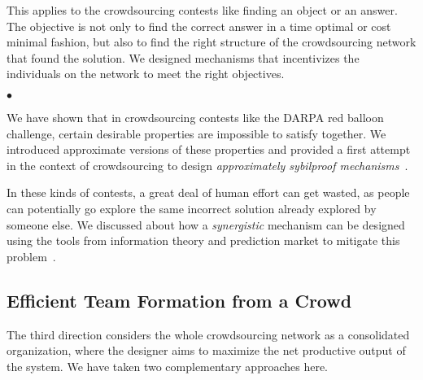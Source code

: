 \documentclass[11pt,psfig,letter]{article}
\newcommand{\squishlisttwo}{
\begin{list}{$\bullet$}
{ \setlength{\itemsep}{0pt}
\setlength{\parsep}{0pt}
\setlength{\topsep}{0pt}
\setlength{\partopsep}{0pt}
\setlength{\leftmargin}{1em}
\setlength{\labelwidth}{1.5em}
\setlength{\labelsep}{0.5em} } }
\newcommand{\squishend}{
\end{list} }
\begin{document}
This applies to the crowdsourcing contests like finding an object or an answer. The objective is not only to find the correct answer in a time optimal or cost minimal fashion, but also to find the right structure of the crowdsourcing network that found the solution. 
We designed mechanisms that incentivizes the individuals on the network to meet the right objectives.

\squishlisttwo
 \item We have shown that in crowdsourcing contests like the DARPA red balloon challenge, certain desirable properties are impossible to satisfy together. We introduced approximate versions of these properties and provided a first attempt in the context of crowdsourcing to design {\em approximately sybilproof mechanisms}~\cite{Nath2012b}. 
 \item In these kinds of contests, a great deal of human effort can get wasted, as people can potentially go explore the same incorrect solution already explored by someone else.
 We discussed about how a {\em synergistic} mechanism can be designed using the tools from information theory and prediction market to mitigate this problem~\cite{Nath2012a}.
\squishend

\subsection*{Efficient Team Formation from a Crowd}

The third direction considers the whole crowdsourcing network as a consolidated organization, where the designer aims to maximize the net productive output of the system. We have taken two complementary approaches here.
\end{document}
